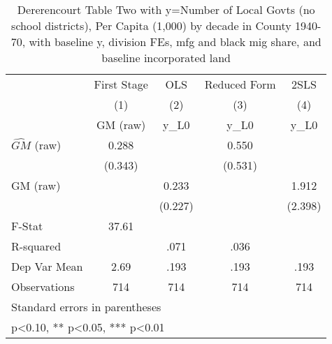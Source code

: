 \begin{table}[htbp]\centering
\def\sym#1{\ifmmode^{#1}\else\(^{#1}\)\fi}
\caption{Dererencourt Table Two with y=Number of Local Govts (no school districts), Per Capita (1,000) by decade in County 1940-70, with baseline y, division FEs, mfg and black mig share, and baseline incorporated land}
\begin{tabular}{l*{4}{c}}
\toprule
                    & First Stage   &         OLS   &Reduced Form   &        2SLS   \\
                    &\multicolumn{1}{c}{(1)}&\multicolumn{1}{c}{(2)}&\multicolumn{1}{c}{(3)}&\multicolumn{1}{c}{(4)}\\
                    &\multicolumn{1}{c}{GM  (raw)}&\multicolumn{1}{c}{y\_L0}&\multicolumn{1}{c}{y\_L0}&\multicolumn{1}{c}{y\_L0}\\
\midrule
$\hat{GM}$ (raw)    &       0.288   &               &       0.550   &               \\
                    &     (0.343)   &               &     (0.531)   &               \\
\addlinespace
GM  (raw)           &               &       0.233   &               &       1.912   \\
                    &               &     (0.227)   &               &     (2.398)   \\
\midrule
F-Stat              &       37.61   &               &               &               \\
R-squared           &               &        .071   &        .036   &               \\
Dep Var Mean        &        2.69   &        .193   &        .193   &        .193   \\
Observations        &         714   &         714   &         714   &         714   \\
\bottomrule
\multicolumn{5}{l}{\footnotesize Standard errors in parentheses}\\
\multicolumn{5}{l}{\footnotesize * p<0.10, ** p<0.05, *** p<0.01}\\
\end{tabular}
\end{table}
